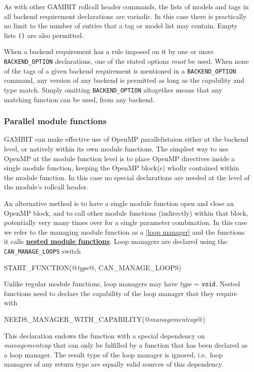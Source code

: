 \documentclass[pdftex,twocolumn,epjc3_preprint,runningheads]{svjour3}
\renewcommand{\_}{\discretionary{\underscore}{}{\underscore}}
\newcommand{\cross}[1]{\ref{#1}}
\newcommand{\doublecross}[2]{\hyperref[#2]{\textbf{#1}}}
\newcommand{\metavarf}[1]{\textit{\color{darkgreen}\footnotesize\textrm{#1}}}
\newcommand{\metavar}{\metavarf}
\newcommand{\gambit}{\textsf{GAMBIT}\xspace}
\newcommand{\GB}{\gambit}
\newcommand{\omp}{\textsf{OpenMP}\xspace}
\begin{document}
As with other \GB rollcall header commands, the lists of models and tags in all backend requirement declarations are variadic.  In this case there is practically no limit to the number of entries that a tag or model list may contain.  Empty lists \lstinline{()} are also permitted.

When a backend requirement has a rule imposed on it by one or more \lstinline{BACKEND_OPTION} declarations, one of the stated options \textit{must} be used.  When none of the tags of a given backend requirement is mentioned in a \lstinline{BACKEND_OPTION} command, any version of any backend is permitted as long as the capability and type match.  Simply omitting \lstinline{BACKEND_OPTION}{\xspace} altogether means that any matching function can be used, from any backend.

\subsubsection{Parallel module functions}
\label{declaration_loops}

\GB can make effective use of \omp parallelistaion either at the backend level, or natively within its own module functions.  The simplest way to use \omp at the module function level is to place \omp directives inside a single module function, keeping the \omp block(s) wholly contained within the module function.  In this case no special declarations are needed at the level of the module's rollcall header.

An alternative method is to have a single module function open and close an \omp block, and to call other module functions (indirectly) within that block, potentially very many times over for a single parameter combination.  In this case we refer to the managing module function as a \cross{loop manager} and the functions it calls \doublecross{nested module functions}{nested module function}.  Loop managers are declared using the \lstinline{CAN_MANAGE_LOOPS} switch
\begin{lstcpp}
START_FUNCTION(@\metavar{type}@, CAN_MANAGE_LOOPS)
\end{lstcpp}
Unlike regular module functions, loop managers may have \metavar{type} = \lstinline{void}.  Nested functions need to declare the capability of the loop manager that they require with
\begin{lstcpp}
NEEDS_MANAGER_WITH_CAPABILITY(@\metavar{management\_cap}@)
\end{lstcpp}
This declaration endows the function with a special dependency on \metavar{management\_cap} that can only be fulfilled by a function that has been declared as a loop manager.  The result type of the loop manager is ignored, i.e.\ loop managers of any return type are equally valid sources of this dependency.
\end{document}
